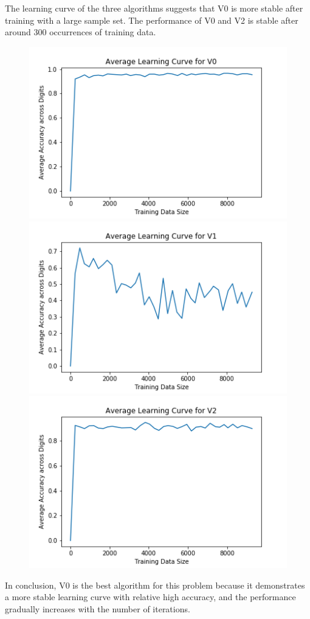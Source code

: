 \documentclass[twoside,11pt]{homework}
\begin{document}
	The learning curve of the three algorithms suggests that V0 is more stable after training with a large sample set.
	The performance of V0 and V2 is stable after around 300 occurrences of training data.
	\begin{figure}[H]
		\includegraphics[scale=0.6]{q6/img/learning_v0.png}\\
		\includegraphics[scale=0.6]{q6/img/learning_v1.png}\\
		\includegraphics[scale=0.6]{q6/img/learning_v2.png}
	\end{figure}
	In conclusion, V0 is the best algorithm for this problem because it demonstrates a more stable learning curve with relative high
	accuracy, and the performance gradually increases with the number of iterations.
\end{document}
